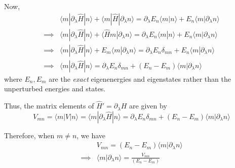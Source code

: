 \documentclass{article}
\newcommand{\ket}[1]{|#1 \rangle}
\newcommand{\bra}[1]{\langle #1|}
\newcommand{\inner}[2]{\langle #1 | #2 \rangle}
\begin{document}
\begin{enumerate}[label=(\alph*)]
  
  Now, 
  \begin{align*}
    &\inner{m}{\partial_{\lambda} \hat{H}|n} + \inner{m}{\hat{H}| \partial_{\lambda} n} = \partial_{\lambda} E_n \inner{m}{n} + E_n \inner{m}{\partial_{\lambda} n}  \\
    \implies&\inner{m}{\partial_{\lambda} \hat{H}|n} + \inner{\hat{H}m}{ \partial_{\lambda} n} = \partial_{\lambda} E_n \inner{m}{n} + E_n \inner{m}{\partial_{\lambda} n}  \\
    \implies&\inner{m}{\partial_{\lambda} \hat{H}|n} + E_m \inner{m}{\partial_{\lambda} n} = \partial_{\lambda} E_n \delta_{mn} + E_n \inner{m}{\partial_{\lambda} n}  \\
    \implies&\inner{m}{\partial_{\lambda} \hat{H}|n} = \partial_{\lambda} E_n \delta_{mn} +( E_n - E_m)\inner{m}{\partial_{\lambda} n}  
  \end{align*}
  where $E_n, E_m$ are the \emph{exact} eigenenergies and eigenstates rather than the unperturbed energies and states.

  Thus, the matrix elements of $\hat{H}' = \partial_{\lambda} H$ are given by 
  \[\boxed{ V_{mn} = \inner{m}{V|n} = \inner{m}{\partial_{\lambda} \hat{H}|n} = \partial_{\lambda} E_n \delta_{mn} +( E_n - E_m)\inner{m}{\partial_{\lambda} n }} \]

  Therefore, when $m \neq n$, we have 
  \begin{align*}
    &V_{mn} = (E_n - E_m) \inner{m}{\partial_{\lambda} n} \\
    \implies& \boxed{\inner{m}{\partial_{\lambda} n} = \frac{V_{mn}}{(E_n - E_m)}}
  \end{align*}


\end{enumerate}
\end{document}
